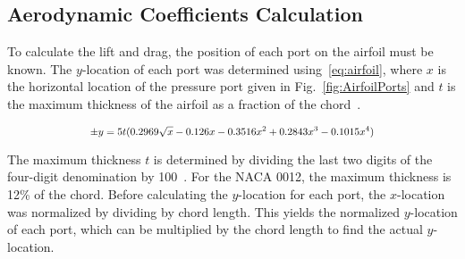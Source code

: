 \documentclass[journal,letterpaper]{IEEEtran}
\begin{document}
\subsection{Aerodynamic Coefficients Calculation}

To calculate the lift and drag, the position of each port on the airfoil must be known.
The $y$-location of each port was determined using~\eqref{eq:airfoil}, where $x$ is the horizontal location of the pressure port given in Fig.~\ref{fig:AirfoilPorts} and $t$ is the maximum thickness of the airfoil as a fraction of the chord~\cite{AirfoilEq}.

\begin{equation} \label{eq:airfoil}
    \resizebox{227pt}{!}{$\displaystyle{\pm y = 5t(0.2969\sqrt{x} - 0.126x - 0.3516x^2 + 0.2843x^3 - 0.1015x^4)}$}
\end{equation}

The maximum thickness $t$ is determined by dividing the last two digits of the four-digit denomination by 100~\cite{AirfoilEq}.
For the NACA 0012, the maximum thickness is 12\% of the chord.
Before calculating the $y$-location for each port, the $x$-location was normalized by dividing by chord length.
This yields the normalized $y$-location of each port, which can be multiplied by the chord length to find the actual $y$-location.
\end{document}

